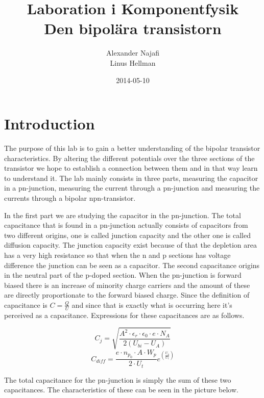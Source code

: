 \documentclass[a4paper]{article}
\title{Laboration i Komponentfysik\\ Den bipolära transistorn}
\author{Alexander Najafi \\ Linus Hellman}
\date{2014-05-10}
\begin{document}
\maketitle
\thispagestyle{empty}
\newpage

\tableofcontents
\newpage
\section{Introduction}
The purpose of this lab is to gain a better understanding of the bipolar transistor characteristics. By altering the different potentials over the three sections of the transistor we hope to establish a connection between them and in that way learn to understand it. The lab mainly consists in three parts, measuring the capacitor in a pn-junction, measuring the current through a pn-junction and measuring the currents through a bipolar npn-transistor.

In the first part we are studying the capacitor in the pn-junction. The total capacitance that is found in a pn-junction actually consists of capacitors from two different origins, one is called junction capacity and the other one is called diffusion capacity. The junction capacity exist because of that the depletion area has a very high resistance so that when the n and p sections has voltage difference the junction can be seen as a capacitor. The second capacitance origins in the neutral part of the p-doped section. When the pn-junction is forward biased there is an increase of minority charge carriers and the amount of these are directly proportionate to the forward biased charge. Since the definition of capacitance is $C=\frac{Q}{U}$ and since that is exactly what is occurring here it's perceived as a capacitance. Expressions for these capacitances are as follows.

\begin{equation}
C_j=\sqrt{\frac{A^2{\cdot}\epsilon_r{\cdot}\epsilon_0{\cdot}e{\cdot}N_A}{2(U_{bi}-U_A)}}
\end{equation}
\begin{equation}
C_{diff}=\frac{e{\cdot}n_{p_0}{\cdot}A{\cdot}W_p}{2{\cdot}U_t}e^{(\frac{U_a}{U_t})}
\end{equation}

The total capacitance for the pn-junction is simply the sum of these two capacitances. The characteristics of these can be seen in the picture below.
\end{document}
